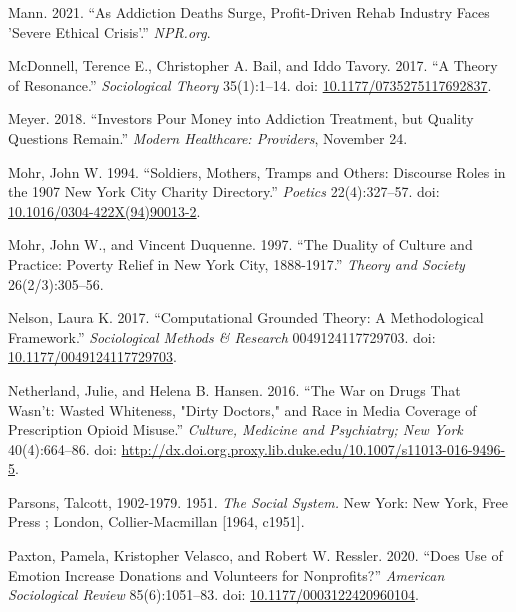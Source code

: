 \documentclass[
  12pt,
]{article}
\begin{document}
\leavevmode\hypertarget{ref-mann2021}{}%
Mann. 2021. ``As Addiction Deaths Surge, Profit-Driven Rehab Industry Faces 'Severe Ethical Crisis'.'' \emph{NPR.org}.

\leavevmode\hypertarget{ref-mcdonnell2017}{}%
McDonnell, Terence E., Christopher A. Bail, and Iddo Tavory. 2017. ``A Theory of Resonance.'' \emph{Sociological Theory} 35(1):1--14. doi: \href{https://doi.org/10.1177/0735275117692837}{10.1177/0735275117692837}.

\leavevmode\hypertarget{ref-meyer2018}{}%
Meyer. 2018. ``Investors Pour Money into Addiction Treatment, but Quality Questions Remain.'' \emph{Modern Healthcare: Providers}, November 24.

\leavevmode\hypertarget{ref-mohr1994}{}%
Mohr, John W. 1994. ``Soldiers, Mothers, Tramps and Others: Discourse Roles in the 1907 New York City Charity Directory.'' \emph{Poetics} 22(4):327--57. doi: \href{https://doi.org/10.1016/0304-422X(94)90013-2}{10.1016/0304-422X(94)90013-2}.

\leavevmode\hypertarget{ref-mohr1997}{}%
Mohr, John W., and Vincent Duquenne. 1997. ``The Duality of Culture and Practice: Poverty Relief in New York City, 1888-1917.'' \emph{Theory and Society} 26(2/3):305--56.

\leavevmode\hypertarget{ref-nelson2017}{}%
Nelson, Laura K. 2017. ``Computational Grounded Theory: A Methodological Framework.'' \emph{Sociological Methods \& Research} 0049124117729703. doi: \href{https://doi.org/10.1177/0049124117729703}{10.1177/0049124117729703}.

\leavevmode\hypertarget{ref-netherland2016}{}%
Netherland, Julie, and Helena B. Hansen. 2016. ``The War on Drugs That Wasn't: Wasted Whiteness, "Dirty Doctors," and Race in Media Coverage of Prescription Opioid Misuse.'' \emph{Culture, Medicine and Psychiatry; New York} 40(4):664--86. doi: \href{https://doi.org/http://dx.doi.org.proxy.lib.duke.edu/10.1007/s11013-016-9496-5}{http://dx.doi.org.proxy.lib.duke.edu/10.1007/s11013-016-9496-5}.

\leavevmode\hypertarget{ref-parsons1951}{}%
Parsons, Talcott, 1902-1979. 1951. \emph{The Social System.} New York: New York, Free Press ; London, Collier-Macmillan {[}1964, c1951{]}.

\leavevmode\hypertarget{ref-paxton2020}{}%
Paxton, Pamela, Kristopher Velasco, and Robert W. Ressler. 2020. ``Does Use of Emotion Increase Donations and Volunteers for Nonprofits?'' \emph{American Sociological Review} 85(6):1051--83. doi: \href{https://doi.org/10.1177/0003122420960104}{10.1177/0003122420960104}.
\end{document}
